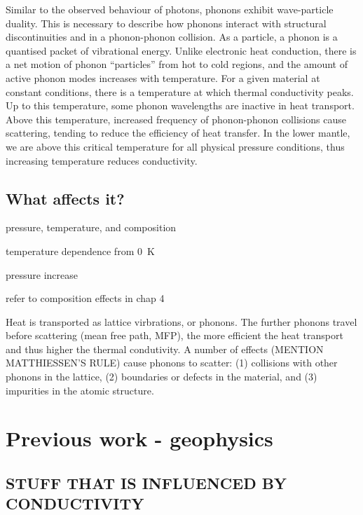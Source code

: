 Similar to the observed behaviour of photons, phonons exhibit wave-particle duality. This is necessary to describe how phonons interact with structural discontinuities and in a phonon-phonon collision. As a particle, a phonon is a quantised packet of vibrational energy. Unlike electronic heat conduction, there is a net motion of phonon ``particles'' from hot to cold regions, and the amount of active phonon modes increases with temperature. For a given material at constant conditions, there is a temperature at which thermal conductivity peaks. Up to this temperature, some phonon wavelengths are inactive in heat transport. Above this temperature, increased frequency of phonon-phonon collisions cause scattering, tending to reduce the efficiency of heat transfer. In the lower mantle, we are above this critical temperature for all physical pressure conditions, thus increasing temperature reduces conductivity.



\subsection{What affects it?}
pressure, temperature, and composition

temperature dependence from 0~K

pressure increase

refer to composition effects in chap 4

Heat is transported as lattice virbrations, or phonons. The further phonons travel before scattering (mean free path, MFP), the more efficient the heat transport and thus higher the thermal condutivity. A number of effects (MENTION MATTHIESSEN'S RULE) cause phonons to scatter: (1) collisions with other phonons in the lattice, (2) boundaries or defects in the material, and (3) impurities in the atomic structure. 





\section{Previous work - geophysics}

\subsection{STUFF THAT IS INFLUENCED BY CONDUCTIVITY}
\label{sec:ch1:cond_in_earth}

